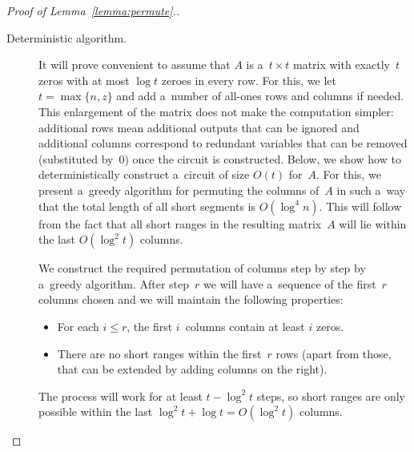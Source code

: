 \begin{proof}[Proof of Lemma~\ref{lemma:permute}.]
\begin{description}
\item[Deterministic algorithm.]

It will prove convenient to assume that $A$ is a~$t \times t$ matrix with exactly~$t$ zeros with at most $\log t$ zeroes in every row. For this, we let $t=\max\{n, z\}$ and add a~number of
all-ones rows and columns if needed. This enlargement of the matrix
does not make the computation simpler: additional rows mean additional outputs that can be ignored and additional columns correspond to redundant variables that can be removed (substituted by~0) once the circuit is constructed. Below, we show how to deterministically construct a~circuit of size $O(t)$ for~$A$.
For this, we present a~greedy algorithm for permuting the columns
of~$A$ in such a~way that the total length of all short segments
is $O(\log^4n)$. This will follow from the fact that all short
ranges in the resulting matrix~$A$ will lie within the last $O(\log^2 t)$ columns.

We construct the required permutation of columns step by step by a~greedy algorithm. After step~$r$ we will have a~sequence of the first~$r$ columns chosen and we will maintain the following properties:
\begin{itemize}
\item For each $i \leq r$, the first $i$~columns contain at least $i$ zeros.
\item There are no short ranges within the first~$r$ rows (apart from those, that can be extended by adding columns on the right).
\end{itemize}
The process will work for at least $t - \log^2 t$ steps, so short ranges are only possible within the last $\log^2 t + \log t = O(\log^2 t)$ columns.


\end{description}
\end{proof}
